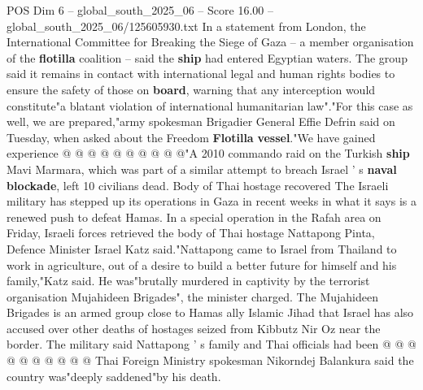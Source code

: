 \begin{textsample}{POS Dim 6 – global\_south\_2025\_06 – Score 16.00 – global\_south\_2025\_06/125605930.txt}
In a statement from London, the International Committee for Breaking the Siege of Gaza -- a member organisation of the \textbf{flotilla} coalition -- said the \textbf{ship} had entered Egyptian waters.
The group said it remains in contact with international legal and human rights bodies to ensure the safety of those on \textbf{board}, warning that any interception would constitute"a blatant violation of international humanitarian law"."For this case as well, we are prepared,"army spokesman Brigadier General Effie Defrin said on Tuesday, when asked about the Freedom \textbf{Flotilla} \textbf{vessel}."We have gained experience @ @ @ @ @ @ @ @ @ @"A 2010 commando raid on the Turkish \textbf{ship} Mavi Marmara, which was part of a similar attempt to breach Israel ' s \textbf{naval} \textbf{blockade}, left 10 civilians dead.
Body of Thai hostage recovered The Israeli military has stepped up its operations in Gaza in recent weeks in what it says is a renewed push to defeat Hamas.
In a special operation in the Rafah area on Friday, Israeli forces retrieved the body of Thai hostage Nattapong Pinta, Defence Minister Israel Katz said."Nattapong came to Israel from Thailand to work in agriculture, out of a desire to build a better future for himself and his family,"Katz said.
He was"brutally murdered in captivity by the terrorist organisation Mujahideen Brigades", the minister charged.
The Mujahideen Brigades is an armed group close to Hamas ally Islamic Jihad that Israel has also accused over other deaths of hostages seized from Kibbutz Nir Oz near the border.
The military said Nattapong ' s family and Thai officials had been @ @ @ @ @ @ @ @ @ @ Thai Foreign Ministry spokesman Nikorndej Balankura said the country was"deeply saddened"by his death.

\end{textsample}

